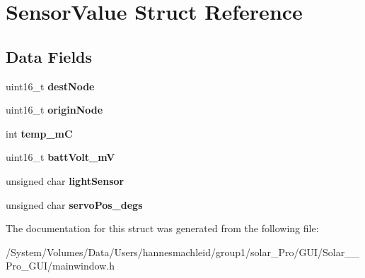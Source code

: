 \hypertarget{struct_sensor_value}{}\section{Sensor\+Value Struct Reference}
\label{struct_sensor_value}
\subsection*{Data Fields}
\begin{DoxyCompactItemize}
\item 
\mbox{\label{struct_sensor_value_aef5711ff7bb5480af57d97c87240005d}} 
uint16\+\_\+t {\bfseries dest\+Node}
\item 
\mbox{\label{struct_sensor_value_a1695cb0364a2e3af46f13105797f9372}} 
uint16\+\_\+t {\bfseries origin\+Node}
\item 
\mbox{\label{struct_sensor_value_abffb7a64bc297ae26d7e326691215934}} 
int {\bfseries temp\+\_\+mC}
\item 
\mbox{\label{struct_sensor_value_aba5b736048ea89b5460e8b0b361c20a6}} 
uint16\+\_\+t {\bfseries batt\+Volt\+\_\+mV}
\item 
\mbox{\label{struct_sensor_value_a88845285526344b96f4956ce83b387d8}} 
unsigned char {\bfseries light\+Sensor}
\item 
\mbox{\label{struct_sensor_value_ad48ba51fdee8a3248fa8fca51680e1e2}} 
unsigned char {\bfseries servo\+Pos\+\_\+degs}
\end{DoxyCompactItemize}


The documentation for this struct was generated from the following file\+:\begin{DoxyCompactItemize}
\item 
/\+System/\+Volumes/\+Data/\+Users/hannesmachleid/group1/solar\+\_\+\+Pro/\+G\+U\+I/\+Solar\+\_\+\+\_\+\+Pro\+\_\+\+G\+U\+I/mainwindow.\+h\end{DoxyCompactItemize}
